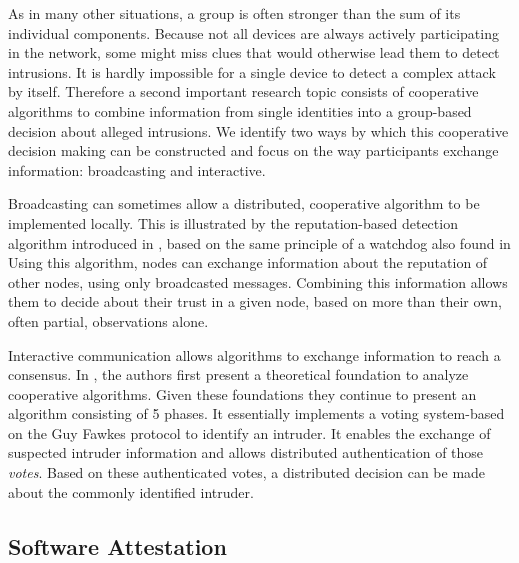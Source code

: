\documentclass[conference]{IEEEtran}
\begin{document}
As in many other situations, a group is often stronger than the sum of its
individual components. Because not all devices are always actively
participating in the network, some might miss clues that would otherwise lead
them to detect intrusions. It is hardly impossible for a single device to
detect a complex attack by itself. Therefore a second important research topic
consists of cooperative algorithms to combine information from single
identities into a group-based decision about alleged
intrusions\cite{zhang2000intrusion}. We identify two ways by which this
cooperative decision making can be constructed and focus on the way
participants exchange information: broadcasting and interactive.

\begin{LaTeXdescription}

  \item[Broadcasting] can sometimes allow a distributed, cooperative algorithm
  to be implemented locally. This is illustrated by the reputation-based
  detection algorithm introduced in \cite{ganeriwal2008reputation}, based on
  the same principle of a watchdog also found in \cite{mishra2004intrusion}
  Using this algorithm, nodes can exchange information about the reputation of
  other nodes, using only broadcasted messages. Combining this information
  allows them to decide about their trust in a given node, based on more than
  their own, often partial, observations alone.

  \item[Interactive] communication allows algorithms to exchange information to
  reach a consensus. In \cite{krontiris2009cooperative}, the authors first
  present a theoretical foundation to analyze cooperative algorithms. Given
  these foundations they continue to present an algorithm consisting of 5
  phases. It essentially implements a voting system-based on the Guy Fawkes
  protocol\cite{anderson1998new} to identify an intruder. It enables the
  exchange of suspected intruder information and allows distributed
  authentication of those \emph{votes}. Based on these authenticated votes, a
  distributed decision can be made about the commonly identified intruder.

\end{LaTeXdescription}

\subsection*{Software Attestation}
\label{subsection:attestation}
\end{document}

